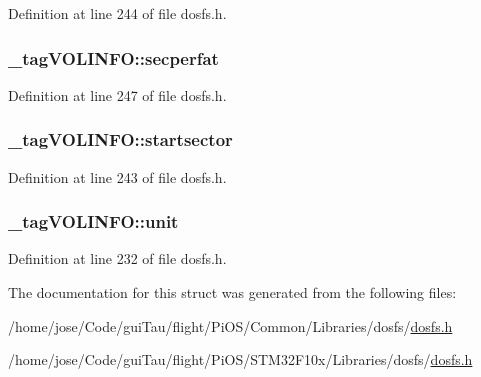 Definition at line 244 of file dosfs.\-h.

\hypertarget{struct__tag_v_o_l_i_n_f_o_a5eecad9a5d1a1582a86b9b965346f68b}{
\subsubsection[{secperfat}]{ \-\_\-tag\-V\-O\-L\-I\-N\-F\-O\-::secperfat}}\label{struct__tag_v_o_l_i_n_f_o_a5eecad9a5d1a1582a86b9b965346f68b}


Definition at line 247 of file dosfs.\-h.

\hypertarget{struct__tag_v_o_l_i_n_f_o_a81725e5affac42409e2efde497cd9d67}{
\subsubsection[{startsector}]{ \-\_\-tag\-V\-O\-L\-I\-N\-F\-O\-::startsector}}\label{struct__tag_v_o_l_i_n_f_o_a81725e5affac42409e2efde497cd9d67}


Definition at line 243 of file dosfs.\-h.

\hypertarget{struct__tag_v_o_l_i_n_f_o_a35c7c89f02f3f0d63d0a1246d1f6a20f}{
\subsubsection[{unit}]{ \-\_\-tag\-V\-O\-L\-I\-N\-F\-O\-::unit}}\label{struct__tag_v_o_l_i_n_f_o_a35c7c89f02f3f0d63d0a1246d1f6a20f}


Definition at line 232 of file dosfs.\-h.



The documentation for this struct was generated from the following files\-:\begin{DoxyCompactItemize}
\item 
/home/jose/\-Code/gui\-Tau/flight/\-Pi\-O\-S/\-Common/\-Libraries/dosfs/\hyperlink{_common_2_libraries_2dosfs_2dosfs_8h}{dosfs.\-h}\item 
/home/jose/\-Code/gui\-Tau/flight/\-Pi\-O\-S/\-S\-T\-M32\-F10x/\-Libraries/dosfs/\hyperlink{_s_t_m32_f10x_2_libraries_2dosfs_2dosfs_8h}{dosfs.\-h}\end{DoxyCompactItemize}
